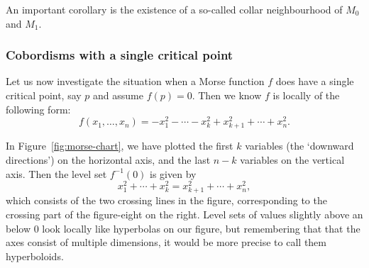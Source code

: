 An important corollary is the existence of a so-called collar neighbourhood of $M_0$ and $M_1$.





\subsubsection*{Cobordisms with a single critical point}
Let us now investigate the situation when a Morse function $f$ does have a single critical point, say $p$ and assume $f(p) = 0$.
Then we know $f$ is locally of the following form:
\[
    f(x_1, \ldots, x_n) = - x_1^2 - \cdots - x_k^2 + x_{k+1}^2 + \cdots + x_n^2
.\] 
\begin{figure}[H]
    \centering
\end{figure}
In Figure~\ref{fig:morse-chart}, we have plotted the first $k$ variables (the `downward directions') on the horizontal axis, and the last $n-k$ variables on the vertical axis.
Then the level set $f^{-1}(0)$ is given by
\[
x_1^2 + \cdots + x_k^2 = x_{k+1} ^2 + \cdots + x_n^2
,\] 
which consists of the two crossing lines in the figure, corresponding to the crossing part of the figure-eight on the right.
Level sets of values slightly above an below $0$ look locally like hyperbolas on our figure, but remembering that that the axes consist of multiple dimensions, it would be more precise to call them hyperboloids.


